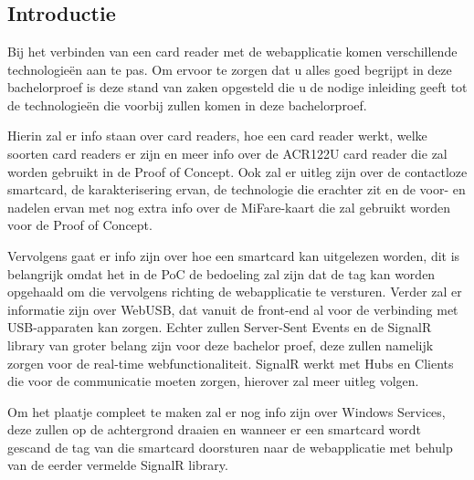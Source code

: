 \chapter{}%
\label{ch:stand-van-zaken}



\section{Introductie}
Bij het verbinden van een card reader met de webapplicatie komen verschillende technologieën aan te pas. Om ervoor te zorgen dat u alles goed begrijpt in deze bachelorproef is deze stand van zaken opgesteld die u de nodige inleiding geeft tot de technologieën die voorbij zullen komen in deze bachelorproef.  

Hierin zal er info staan over card readers, hoe een card reader werkt, welke soorten card readers er zijn en meer info over de ACR122U card reader die zal worden gebruikt in de Proof of Concept. Ook zal er uitleg zijn over de contactloze smartcard, de karakterisering ervan, de technologie die erachter zit en de voor- en nadelen ervan met nog extra info over de MiFare-kaart die zal gebruikt worden voor de Proof of Concept.  

Vervolgens gaat er info zijn over hoe een smartcard kan uitgelezen worden, dit is belangrijk omdat het in de PoC de bedoeling zal zijn dat de tag kan worden opgehaald om die vervolgens richting de webapplicatie te versturen. Verder zal er informatie zijn over WebUSB, dat vanuit de front-end al voor de verbinding met USB-apparaten kan zorgen. Echter zullen Server-Sent Events en de SignalR library van groter belang zijn voor deze bachelor proef, deze zullen namelijk zorgen voor de real-time webfunctionaliteit. SignalR werkt met Hubs en Clients die voor de communicatie moeten zorgen, hierover zal meer uitleg volgen. 

Om het plaatje compleet te maken zal er nog info zijn over Windows Services, deze zullen op de achtergrond draaien en wanneer er een smartcard wordt gescand de tag van die smartcard doorsturen naar de webapplicatie met behulp van de eerder vermelde SignalR library.


